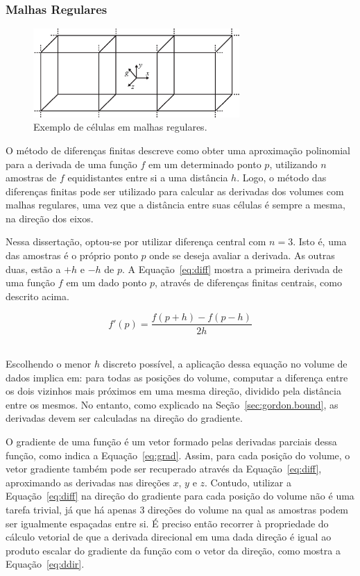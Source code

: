 \subsubsection{Malhas Regulares}
\label{subsec:my.struct}

\begin{figure}[h]
	\centering
	\includegraphics[width=0.7\textwidth]{images/m_regular_cells}
	\caption{Exemplo de células em malhas regulares.}
	\label{fig:m_regular_cells}
\end{figure}

	O método de diferenças finitas descreve como obter uma aproximação polinomial para a derivada de uma função $ f $ em um determinado ponto $ p $, utilizando $ n $ amostras de $ f $ equidistantes entre si a uma distância $ h $. Logo, o método das diferenças finitas pode ser utilizado para calcular as derivadas dos volumes com malhas regulares, uma vez que a distância entre suas células é sempre a mesma, na direção dos eixos.
	
	Nessa dissertação, optou-se por utilizar diferença central com $ n = 3 $. Isto é, uma das amostras é o próprio ponto $ p $ onde se deseja avaliar a derivada. As outras duas, estão a $ +h $ e $ -h $ de $ p $. A Equação~\eqref{eq:diff} mostra a primeira derivada de uma função $ f $ em um dado ponto $ p $, através de diferenças finitas centrais, como descrito acima.
	
\begin{equation}\label{eq:diff}
	f'(p) = \frac{f(p + h) - f(p - h)}{2h}
\end{equation} \

	Escolhendo o menor $ h $ discreto possível, a aplicação dessa equação no volume de dados implica em: para todas as posições do volume, computar a diferença entre os dois vizinhos mais próximos em uma mesma direção, dividido pela distância entre os mesmos. No entanto, como explicado na Seção~\ref{sec:gordon.bound}, as derivadas devem ser calculadas na direção do gradiente.
	
	O gradiente de uma função é um vetor formado pelas derivadas parciais dessa função, como indica a Equação~\eqref{eq:grad}. Assim, para cada posição do volume, o vetor gradiente também pode ser recuperado através da Equação~\eqref{eq:diff}, aproximando as derivadas nas direções $ x $, $ y $ e $ z $. Contudo, utilizar a Equação~\eqref{eq:diff} na direção do gradiente para cada posição do volume não é uma tarefa trivial, já que há apenas 3 direções do volume na qual as amostras podem ser igualmente espaçadas entre si. É preciso então recorrer à propriedade do cálculo vetorial de que a derivada direcional em uma dada direção é igual ao produto escalar do gradiente da função com o vetor da direção, como mostra a Equação~\eqref{eq:ddir}.
	

